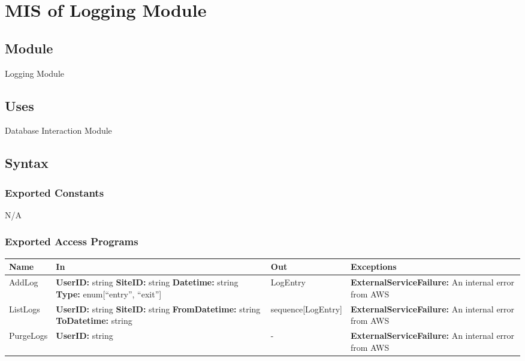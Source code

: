 \documentclass[12pt, titlepage]{article}
\begin{document}
\section{MIS of Logging Module} \label{Module}

\subsection{Module}

Logging Module

\subsection{Uses}

Database Interaction Module

\subsection{Syntax}

\subsubsection{Exported Constants}

N/A

\subsubsection{Exported Access Programs}

\begin{center}
  \begin{tabular}{>{\raggedright}p{3cm} >{\raggedright}p{5cm}
    >{\raggedright}p{4cm} p{4cm}}
    \hline
    \textbf{Name} & \textbf{In} & \textbf{Out} & \textbf{Exceptions} \\
    \hline
    AddLog & \textbf{UserID:} string \newline \textbf{SiteID:} string
    \newline \textbf{Datetime:} string \newline \textbf{Type:}
    enum[``entry'', ``exit''] & LogEntry &
    \textbf{ExternalServiceFailure:} An internal error from AWS \\
    \hline
    ListLogs & \textbf{UserID:} string \newline \textbf{SiteID:}
    string \newline \textbf{FromDatetime:} string \newline
    \textbf{ToDatetime:} string &
    sequence[LogEntry] & \textbf{ExternalServiceFailure:} An internal
    error from AWS \\
    \hline
    PurgeLogs & \textbf{UserID:} string & - &
    \textbf{ExternalServiceFailure:} An internal error from AWS \\
    \hline
  \end{tabular}
\end{center}
\end{document}

